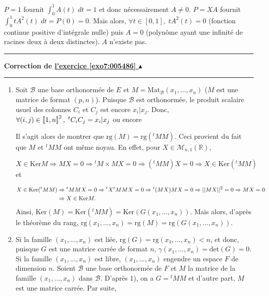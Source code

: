 \documentclass[11pt,a4paper]{article}
\newcommand{\Rr}{\mathbb{R}} \newcommand{\R}{\mathbb{R}}
\newcommand{\llbracket}{\left[\kern-0.15em\left[}
\newcommand{\rrbracket}{\right]\kern-0.15em\right]}
\newcounter{exo}
\newcommand{\correction}[1]{\hypertarget{cor7:#1}{}\label{cor7:#1}{\bf Correction de \hyperlink{exo7:#1}{l'exercice \ref{exo7:#1} $\blacktriangle$}}\vspace{1mm}\hrule\vspace{1mm}}
\newcommand{\fincorrection}{\vspace{1mm}\hrule\vspace*{7mm}}
\begin{document}
$P=1$ fournit $\int_{0}^{1}A(t)\;dt=1$ et donc nécessairement $A\neq0$. $P=XA$ fournit $\int_{0}^{1}tA^2(t)\;dt=P(0)=0$.
Mais alors, $\forall t\in[0,1],\;tA^2(t)=0$ (fonction continue positive d'intégrale nulle) puis $A=0$ (polynôme ayant une infinité de racines deux à deux distinctes). $A$ n'existe pas.
\fincorrection
\correction{005486}
\begin{enumerate}
 \item  Soit $\mathcal{B}$ une base orthonormée de $E$ et $M=\mbox{Mat}_{\mathcal{B}}(x_1,...,x_n)$ ($M$ est une matrice de format $(p,n)$).
Puisque $\mathcal{B}$ est orthonormée, le produit scalaire usuel des colonnes $C_i$ et $C_j$ est encore $x_i|x_j$.
Donc, $\forall(i,j)\in\llbracket1,n\rrbracket^2,\;{^t}C_iC_j=x_i|x_j$ ou encore 

\begin{center}
\end{center}
Il s'agit alors de montrer que $\mbox{rg}(M)=\mbox{rg}({^t}MM)$. Ceci provient du fait que $M$ et ${^t}MM$ ont même noyau. En effet, pour $X\in\mathcal{M}_{n,1}(\Rr)$, 

$$X\in\mbox{Ker}M\Rightarrow MX=0\Rightarrow{^t}M\times MX=0\Rightarrow({^t}MM)X=0\Rightarrow X\in\mbox{Ker}({^t}MM)$$
et

\begin{align*}\ensuremath
X\in\mbox{Ker}({^t}MM)&\Rightarrow{^t}MMX=0\Rightarrow{^t}X{^t}MMX=0\Rightarrow{^t}(MX)MX=0\Rightarrow||MX||^2=0\Rightarrow MX=0\\
 &\Rightarrow X\in\mbox{Ker}M.
\end{align*}
Ainsi, $\text{Ker}(M)=\text{Ker}({^t}MM)=\text{Ker}(G(x_1,\ldots,x_n))$. Mais alors, d'après le théorème du rang, $\text{rg}(x_1,\ldots,x_n)=\text{rg}(M)=\text{rg}(G(x_1,\ldots,x_n))$.

\begin{center}
\end{center}
 \item  Si la famille $(x_1,...,x_n)$ est liée, $\mbox{rg}(G)=\mbox{rg}(x_1,...,x_n)<n$, et donc, puisque $G$ est une matrice carrée de format $n$, $\gamma(x_1,...,x_n)=\mbox{det}(G)=0$.
Si la famille $(x_1, ... ,x_n)$ est libre, $(x_1,...,x_n)$ engendre un espace $F$ de dimension $n$. Soient $\mathcal{B}$ une base orthonormée de $F$ et $M$ la matrice de la famille $(x_1,...,x_n)$ dans $\mathcal{B}$. D'après 1), on a $G={^t}MM$ et d'autre part, $M$ est une matrice carrée. Par suite,


\end{enumerate}
\end{document}
